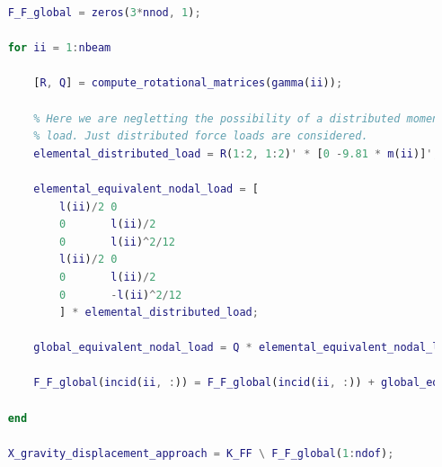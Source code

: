 \begin{lstlisting}[language=Matlab, caption={Displacement approach to compute the static responses of the structure.}]
    % Displacement approach.
    F_F_global = zeros(3*nnod, 1);

    for ii = 1:nbeam

        [R, Q] = compute_rotational_matrices(gamma(ii));

        % Here we are negletting the possibility of a distributed momentum
        % load. Just distributed force loads are considered.
        elemental_distributed_load = R(1:2, 1:2)' * [0 -9.81 * m(ii)]';

        elemental_equivalent_nodal_load = [
            l(ii)/2 0
            0       l(ii)/2
            0       l(ii)^2/12
            l(ii)/2 0
            0       l(ii)/2
            0       -l(ii)^2/12
            ] * elemental_distributed_load;

        global_equivalent_nodal_load = Q * elemental_equivalent_nodal_load;

        F_F_global(incid(ii, :)) = F_F_global(incid(ii, :)) + global_equivalent_nodal_load;

    end

    X_gravity_displacement_approach = K_FF \ F_F_global(1:ndof);
\end{lstlisting}